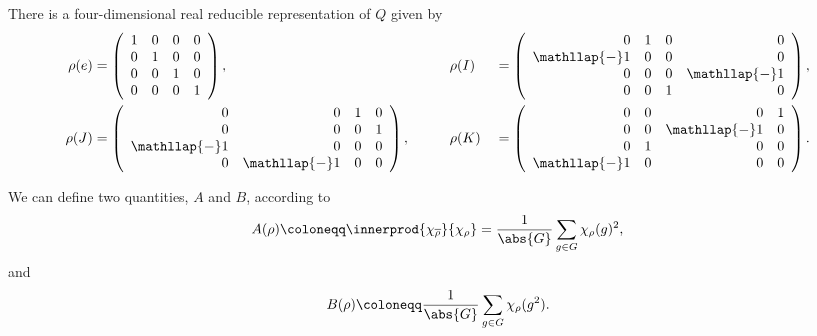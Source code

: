 \begin{exm}{}{}
    There is a four-dimensional real reducible representation of \(Q\) given
    by
    \begin{alignat}{3}
        \rho(e) &= \left(
        \begin{array}{rrrr}
            1 & 0 & 0 & 0\\
            0 & 1 & 0 & 0\\
            0 & 0 & 1 & 0\\
            0 & 0 & 0 & 1
        \end{array}
        \right), \qquad && \rho(I) &= \left(
        \begin{array}{rrrr}
            0 & 1 & 0 & 0\\
            \mathllap{-}1 & 0 & 0 & 0\\
            0 & 0 & 0 & \mathllap{-}1\\
            0 & 0 & 1 & 0
        \end{array}
        \right),\\
        \rho(J) &= \left(
        \begin{array}{rrrr}
            0 & 0 & 1 & 0\\
            0 & 0 & 0 & 1\\
            \mathllap{-}1 & 0 & 0 & 0\\
            0 & \mathllap{-}1 & 0 & 0
        \end{array}
        \right), \qquad && \rho(K) &{} = \left(
        \begin{array}{rrrr}
            0 & 0 & 0 & 1\\
            0 & 0 & \mathllap{-}1 & 0\\
            0 & 1 & 0 & 0\\
            \mathllap{-}1 & 0 & 0 & 0
        \end{array}
        \right).
    \end{alignat}
\end{exm}

We can define two quantities, \(A\) and \(B\), according to
\begin{equation}
    A(\rho) \coloneqq \innerprod{\chi_{\overline{\rho}}}{\chi_{\rho}} =
    \frac{1}{\abs{G}} \sum_{g \in G} \chi_{\rho}(g)^2,
\end{equation}
and
\begin{equation}
    B(\rho) \coloneqq \frac{1}{\abs{G}} \sum_{g \in G} \chi_{\rho}(g^2).
\end{equation}


